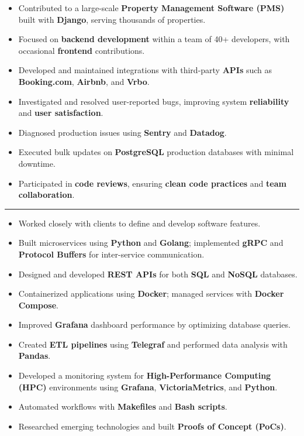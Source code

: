 
\begin{itemize}
    \item Contributed to a large-scale \textbf{Property Management Software (PMS)} built with \textbf{Django}, serving thousands of properties.
    \item Focused on \textbf{backend development} within a team of 40+ developers, with occasional \textbf{frontend} contributions.
    \item Developed and maintained integrations with third-party \textbf{APIs} such as \textbf{Booking.com}, \textbf{Airbnb}, and \textbf{Vrbo}.
    \item Investigated and resolved user-reported bugs, improving system \textbf{reliability} and \textbf{user satisfaction}.
    \item Diagnosed production issues using \textbf{Sentry} and \textbf{Datadog}.
    \item Executed bulk updates on \textbf{PostgreSQL} production databases with minimal downtime.
    \item Participated in \textbf{code reviews}, ensuring \textbf{clean code practices} and \textbf{team collaboration}.
\end{itemize}
\noindent\rule{\linewidth}{0.25pt}  %


\begin{itemize}
    \item Worked closely with clients to define and develop software features.
    \item Built microservices using \textbf{Python} and \textbf{Golang}; implemented \textbf{gRPC} and \textbf{Protocol Buffers} for inter-service communication.
    \item Designed and developed \textbf{REST APIs} for both \textbf{SQL} and \textbf{NoSQL} databases.
    \item Containerized applications using \textbf{Docker}; managed services with \textbf{Docker Compose}.
    \item Improved \textbf{Grafana} dashboard performance by optimizing database queries.
    \item Created \textbf{ETL pipelines} using \textbf{Telegraf} and performed data analysis with \textbf{Pandas}.
    \item Developed a monitoring system for \textbf{High-Performance Computing (HPC)} environments using \textbf{Grafana}, \textbf{VictoriaMetrics}, and \textbf{Python}.
    \item Automated workflows with \textbf{Makefiles} and \textbf{Bash scripts}.
    \item Researched emerging technologies and built \textbf{Proofs of Concept (PoCs)}.
\end{itemize}
